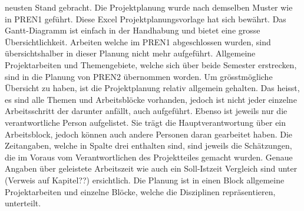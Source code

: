 neusten Stand gebracht. 
\newline
\newline
Die Projektplanung wurde nach demselben Muster wie in PREN1 geführt. Diese Excel 
Projektplanungsvorlage hat sich bewährt. Das Gantt-Diagramm ist einfach in der 
Handhabung und bietet eine grosse Übersichtlichkeit. Arbeiten welche im PREN1 
abgeschlossen wurden, sind übersichtshalber in dieser Planung nicht mehr 
aufgeführt. Allgemeine Projektarbeiten und Themengebiete, welche sich über beide 
Semester erstrecken, sind in die Planung von PREN2 übernommen worden. Um 
grösstmögliche Übersicht zu haben, ist die Projektplanung relativ allgemein 
gehalten. Das heisst, es sind alle Themen und Arbeitsblöcke vorhanden, jedoch 
ist nicht jeder einzelne Arbeitsschritt der darunter anfällt, auch aufgeführt. 
\newline
Ebenso ist jeweils nur die verantwortliche Person aufgelistet. Sie trägt die 
Hauptverantwortung über ein Arbeitsblock, jedoch können auch andere Personen 
daran gearbeitet haben. Die Zeitangaben, welche in Spalte drei enthalten sind, 
sind jeweils die Schätzungen, die im Voraus vom Verantwortlichen des Projektteiles 
gemacht wurden. Genaue Angaben über geleistete Arbeitszeit wie auch ein 
Soll-Istzeit Vergleich sind unter (Verweis auf Kapitel??) ersichtlich. 
\newline
Die Planung ist in einen Block allgemeine Projektarbeiten und einzelne Blöcke, welche die 
Disziplinen repräsentieren, unterteilt.
